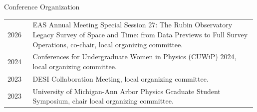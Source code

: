 \begin{rSection}{Conference Organization}
\setlength{\extrarowheight}{3pt}
\begin{longtable}{p{0.1\linewidth}p{0.89\linewidth}}
     2026 &  EAS Annual Meeting Special Session 27: The Rubin Observatory Legacy Survey of Space and Time: from Data Previews to Full Survey Operations, co-chair, local organizing committee. \\
     2024 &  Conferences for Undergraduate Women in Physics (CUWiP) 2024, local organizing committee. \\
     2023 &  DESI Collaboration Meeting, local organizing committee. \\
     2023 & University of Michigan-Ann Arbor Physics Graduate Student Symposium, chair local organizing committee.
\end{longtable}
\end{rSection}
